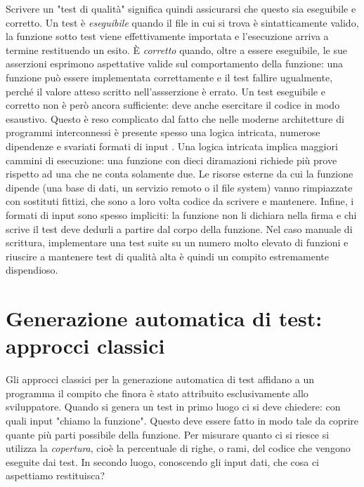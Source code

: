 Scrivere un "test di qualità" significa quindi assicurarsi che questo sia eseguibile e corretto. Un test è \emph{eseguibile} quando il file in cui si trova è sintatticamente valido, la funzione sotto test viene effettivamente importata e l'esecuzione arriva a termine restituendo un esito. È \emph{corretto} quando, oltre a essere eseguibile, le sue asserzioni esprimono aspettative valide sul comportamento della funzione: una funzione può essere implementata correttamente e il test fallire ugualmente, perché il valore atteso scritto nell'assserzione è errato.  Un test eseguibile e corretto non è però ancora sufficiente: deve anche esercitare il codice in modo esaustivo. Questo è reso complicato dal fatto che nelle moderne architetture di programmi interconnessi è presente spesso una logica intricata, numerose dipendenze e svariati formati di input \cite{huang2025ult}. Una logica intricata implica maggiori cammini di esecuzione: una funzione con dieci diramazioni richiede più prove rispetto ad una che ne conta solamente due. Le risorse esterne da cui la funzione dipende (una base di dati, un servizio remoto o il file system) vanno rimpiazzate con sostituti fittizi, che sono a loro volta codice da scrivere e mantenere. Infine, i formati di input sono spesso impliciti: la funzione non li dichiara nella firma e chi scrive il test deve dedurli a partire dal corpo della funzione.  Nel caso manuale di scrittura, implementare una test suite su un numero molto elevato di funzioni e riuscire a mantenere test di qualità alta è quindi un compito estremamente dispendioso.


\section{Generazione automatica di test: approcci classici}
\label{sec:classici}

Gli approcci classici per la generazione automatica di test affidano a un programma il compito che finora è stato attribuito esclusivamente allo sviluppatore. Quando si genera un test in primo luogo ci si deve chiedere: con quali input "chiamo la funzione". Questo deve essere fatto in modo tale da coprire quante più parti possibile della funzione. Per misurare quanto ci si riesce si utilizza la \emph{copertura}, cioè la percentuale di righe, o rami, del codice che vengono eseguite dai test. In secondo luogo, conoscendo gli input dati, che cosa ci aspettiamo restituisca? 

